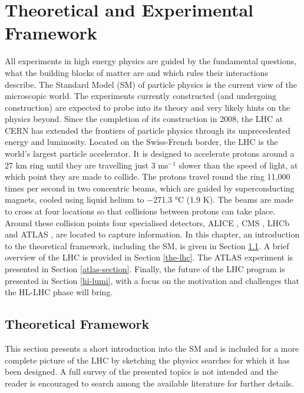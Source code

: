 \graphicspath{{\subfix{../images/}}}
\doublespacing

\chapter{Theoretical and Experimental Framework}
\label{chapter-2}

All experiments in high energy physics are guided by the fundamental questions, what the building blocks of matter are and which rules their interactions describe. The Standard Model (SM) of particle physics is the current view of the microscopic world. The experiments currently constructed (and undergoing construction) are expected to probe into its theory and very likely hints on the physics beyond. Since the completion of its construction in 2008, the \ac{LHC} \cite{Evans:2008zzb} at CERN has extended the frontiers of particle physics through its unprecedented energy and luminosity. Located on the Swiss-French border, the \ac{LHC} is the world’s largest particle accelerator. It is designed to accelerate protons around a 27 km ring until they are travelling just 3 ms$^{-1}$ slower than the speed of light, at which point they are made to collide. The protons travel round the ring 11,000 times per second in two concentric beams, which are guided by superconducting magnets, cooled using liquid helium to \num{-271.3} \si{\degree}C (1.9 K). The beams are made to cross at four locations so that collisions between protons can take place. Around these collision points four specialised detectors, ALICE \cite{AliceCollaboration_2008}, CMS \cite{CMS-TDR-08-001}, LHCb \cite{LHCbCollaboration_2008} and ATLAS \cite{PERF-2007-01}, are located to capture information. In this chapter, an introduction to the theoretical framework, including the SM, is given in Section \ref{theo-framework}. A brief overview of the \ac{LHC} is provided in Section \ref{the-lhc}. The ATLAS experiment is presented in Section \ref{atlas-section}. Finally, the future of the \ac{LHC} program is presented in Section \ref{hi-lumi}, with a focus on the motivation and challenges that the  \ac{HL-LHC} phase will bring.

\section{Theoretical Framework}
\label{theo-framework}
This section presents a short introduction into the SM and is included for a more complete picture of the LHC by sketching the physics searches for which it has been designed. A full survey of the presented topics is not intended and the reader is encouraged to search among the available literature for further details.


